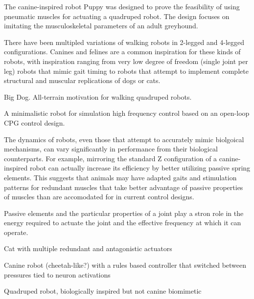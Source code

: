 
The canine-inspired robot Puppy was designed to prove the feasibility of using
pneumatic muscles for actuating a quadruped robot. The design focuses on 
imitating the musculoskeletal parameters of an adult greyhound. 
\cite{PuppyDesign}


There have been multipled variations of walking robots in 2-legged and 4-legged
configurations. Canines and felines are a common inspiration for these kinds of
robots, with inspiration ranging from very low degree of freedom (single joint
per leg) robots that mimic gait timing to robots that attempt to implement
complete structural and muscular replications of dogs or cats.


Big Dog. All-terrain motivation for walking quadruped robots. \cite{BigDog}

A minimalistic robot for simulation high frequency control based on an open-loop
CPG control design. 
\cite{Narioka2012}



The dynamics of robots, even those that attempt to accurately mimic biolgoical
mechanisms, can vary significantly in performance from their biological
counterparts. For example, mirroring the standard Z configuration of a canine-
inspired robot can actually increase its efficiency by better utilizing passive
spring elements. This suggests that animals may have adapted gaits and
stimulation patterns for redundant muscles that take better advantage of passive
properties of muscles than are accomodated for in current control designs.
\cite{HindLegMorphology}

Passive elements and the particular properties of a joint play a stron role in
the energy required to actuate the joint and the effective frequency at which it
can operate. \cite{Na2015}



Cat with multiple redundant and antagonistic actuators
\cite{Rosendo2013}

Canine robot (cheetah-like?) with a rules based controller that switched between
pressures tied to neuron activations
\cite{Pneupard2013}

Quadruped robot, biologically inspired but not canine biomimetic \cite{Wait2014}



